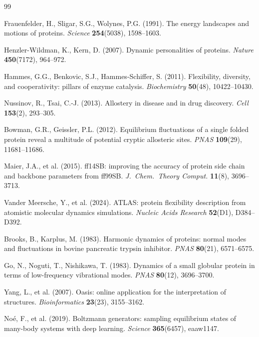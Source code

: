 \documentclass[12pt,letterpaper]{article}
\begin{document}
\begin{thebibliography}{99}

Frauenfelder, H., Sligar, S.G., Wolynes, P.G. (1991).
The energy landscapes and motions of proteins.
\textit{Science} \textbf{254}(5038), 1598--1603.

Henzler-Wildman, K., Kern, D. (2007).
Dynamic personalities of proteins.
\textit{Nature} \textbf{450}(7172), 964--972.

Hammes, G.G., Benkovic, S.J., Hammes-Schiffer, S. (2011).
Flexibility, diversity, and cooperativity: pillars of enzyme catalysis.
\textit{Biochemistry} \textbf{50}(48), 10422--10430.

Nussinov, R., Tsai, C.-J. (2013).
Allostery in disease and in drug discovery.
\textit{Cell} \textbf{153}(2), 293--305.

Bowman, G.R., Geissler, P.L. (2012).
Equilibrium fluctuations of a single folded protein reveal a multitude of potential cryptic allosteric sites.
\textit{PNAS} \textbf{109}(29), 11681--11686.

Maier, J.A., et al. (2015).
ff14SB: improving the accuracy of protein side chain and backbone parameters from ff99SB.
\textit{J.\ Chem.\ Theory Comput.} \textbf{11}(8), 3696--3713.

Vander Meersche, Y., et al. (2024).
ATLAS: protein flexibility description from atomistic molecular dynamics simulations.
\textit{Nucleic Acids Research} \textbf{52}(D1), D384--D392.

Brooks, B., Karplus, M. (1983).
Harmonic dynamics of proteins: normal modes and fluctuations in bovine pancreatic trypsin inhibitor.
\textit{PNAS} \textbf{80}(21), 6571--6575.

Go, N., Noguti, T., Nishikawa, T. (1983).
Dynamics of a small globular protein in terms of low-frequency vibrational modes.
\textit{PNAS} \textbf{80}(12), 3696--3700.

Yang, L., et al. (2007).
Oasis: online application for the interpretation of structures.
\textit{Bioinformatics} \textbf{23}(23), 3155--3162.

No\'{e}, F., et al. (2019).
Boltzmann generators: sampling equilibrium states of many-body systems with deep learning.
\textit{Science} \textbf{365}(6457), eaaw1147.


\end{thebibliography}
\end{document}
